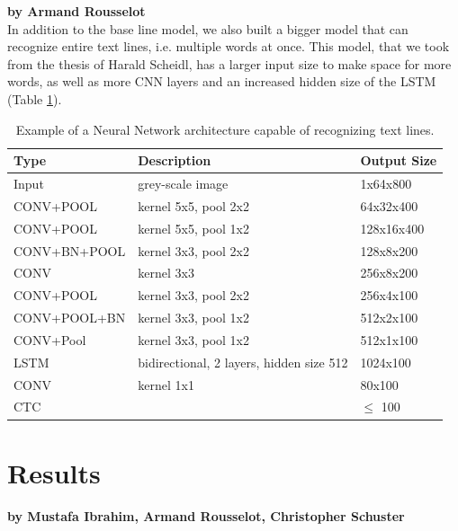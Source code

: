 \documentclass{article}
\begin{document}
\textbf{by Armand Rousselot} \\

In addition to the base line model, we also built a bigger model that can recognize entire text lines, i.e. multiple words at once. This model, that we took from the thesis of Harald Scheidl\cite{ScheidlThesis}, has a larger input size to make space for more words, as well as more CNN layers and an increased hidden size of the LSTM (Table \ref{tab:BigModel}).
\begin{table}[H]
\centering
\begin{tabular}{l|l|l}
Type & Description & Output Size \\ \hline
Input & grey-scale image & 1x64x800 \\ \hline
CONV+POOL & kernel 5x5, pool 2x2 & 64x32x400 \\ \hline
CONV+POOL & kernel 5x5, pool 1x2 & 128x16x400 \\ \hline
CONV+BN+POOL & kernel 3x3, pool 2x2 & 128x8x200 \\ \hline
CONV & kernel 3x3 & 256x8x200 \\ \hline
CONV+POOL & kernel 3x3, pool 2x2 & 256x4x100 \\ \hline
CONV+POOL+BN & kernel 3x3, pool 1x2 & 512x2x100 \\ \hline
CONV+Pool & kernel 3x3, pool 1x2 & 512x1x100 \\ \hline
LSTM         & bidirectional, 2 layers, hidden size 512 & 1024x100 \\ \hline
CONV         & kernel 1x1 & 80x100 \\ \hline
CTC          &      & \(\leqslant\) 100 \\ \hline
\end{tabular}
\caption{Example of a Neural Network architecture capable of recognizing text lines.}
\label{tab:BigModel}
\end{table}

\newpage
\section{Results}

\textbf{by Mustafa Ibrahim, Armand Rousselot, Christopher Schuster} \\
\end{document}
